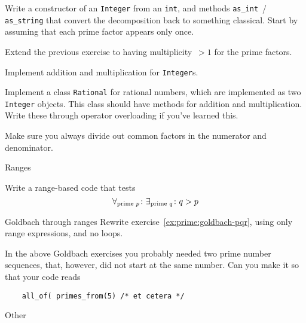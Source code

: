 \begin{exercise}
  Write a constructor of an \lstinline{Integer} from an \lstinline{int},
  and methods \lstinline{as_int}~/ \lstinline{as_string} that convert the
  decomposition back to something classical. Start by assuming that each prime factor
  appears only once.
\end{exercise}

\begin{exercise}
  Extend the previous exercise to having multiplicity~$>1$ for the prime factors.
\end{exercise}

Implement addition and multiplication for \lstinline{Integer}s.

Implement a class \lstinline{Rational} for rational numbers, which
are implemented as two \lstinline{Integer} objects.
This class should have methods for addition and multiplication.
Write these through operator overloading if you've learned this.

Make sure you always divide out common factors in the numerator and denominator.

 {Ranges}


\begin{exercise}
  Write a range-based code that tests
  \[ \forall_{\hbox{\scriptsize prime $p$}}\colon
       \exists_{\hbox{\scriptsize prime $q$}}\colon
       q>p
  \]
\end{exercise}

\begin{exercise}{Goldbach through ranges}
  \label{ex:goldbach-range20}
  Rewrite exercise~\ref{ex:prime:goldbach-pqr},
  using only range expressions, and no loops.
\end{exercise}

\begin{exercise}
  In the above Goldbach exercises you probably needed two
  prime number sequences, that, however, did not start at the same number.
  Can you make it so that your code reads
  \begin{lstlisting}
    all_of( primes_from(5) /* et cetera */
  \end{lstlisting}
\end{exercise}

 {Other}

